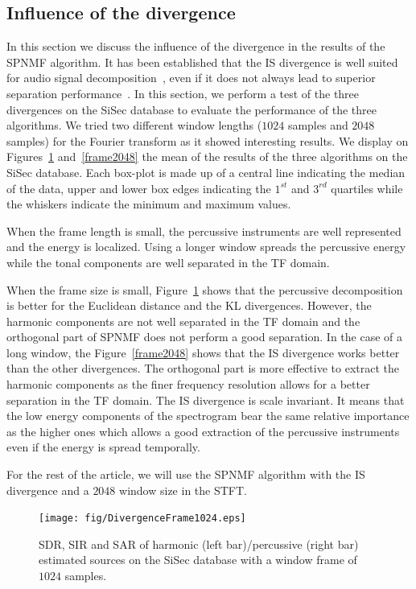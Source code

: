 \subsection{Influence of the divergence}
\label{setup:divergence}

In this section we discuss the influence of the divergence in the results of the SPNMF algorithm. It has been established that the IS divergence is well suited for audio signal decomposition~\cite{gray1980distortion}, even if it does not always lead to superior separation performance~\cite{canadas2014percussive}. In this section, we perform a test of the three divergences on the SiSec database to evaluate the performance of the three algorithms. We tried two different window lengths ($1024$ samples and $2048$ samples) for the Fourier transform as it showed interesting results. We display on Figures~\ref{frame1024} and~\ref{frame2048} the mean of the results of the three algorithms on the SiSec database. Each box-plot is made up of a central line indicating the median of the data, upper and lower box edges indicating the $1^{st}$ and $3^{rd}$ quartiles while the whiskers indicate the minimum and maximum values. 

When the frame length is small, the percussive instruments are well represented and the energy is localized. Using a longer window spreads the percussive energy while the tonal components are well separated in the TF domain.

When the frame size is small, Figure~\ref{frame1024} shows that the percussive decomposition is better for the Euclidean distance and the KL divergences. However, the harmonic components are not well separated in the TF domain and the orthogonal part of SPNMF does not perform a good separation.  
In the case of a long window, the Figure~\ref{frame2048} shows that the IS divergence works better than the other divergences. The orthogonal part is more effective to extract the harmonic components as the finer frequency resolution allows for a better separation in the TF domain. The IS divergence is scale invariant. It means that the low energy components of the spectrogram bear the same relative importance as the higher ones which allows a good extraction of the percussive instruments even if the energy is spread temporally.


For the rest of the article, we will use the SPNMF algorithm with the IS divergence and a $2048$ window size in the STFT.


\begin{figure}[htb]

  \centering 
  \texttt{[image: fig/DivergenceFrame1024.eps]}
  \caption{\label{frame1024} SDR, SIR and SAR of harmonic (left bar)/percussive (right bar) estimated sources on the SiSec database with a window frame of $1024$ samples.}
  
\end{figure}


